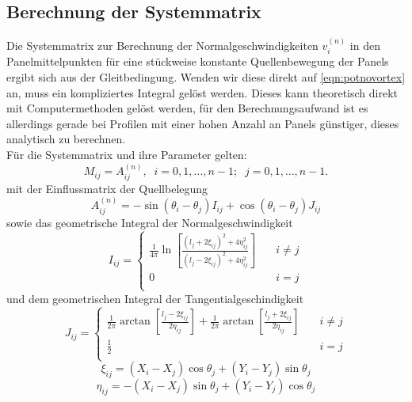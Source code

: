 \subsection{Berechnung der Systemmatrix}
\label{chap:systemmatrixtheory}
Die Systemmatrix zur Berechnung der Normalgeschwindigkeiten $v_i^{(n)}$ in den Panelmittelpunkten für eine stückweise konstante Quellenbewegung der Panels ergibt sich aus der Gleitbedingung. Wenden wir diese direkt auf \ref{eqn:potnovortex} an, muss ein kompliziertes Integral gelöst werden. Dieses kann theoretisch direkt mit Computermethoden gelöst werden, für den Berechnungsaufwand ist es allerdings gerade bei Profilen mit einer hohen Anzahl an Panels günstiger, dieses analytisch zu berechnen. \\
Für die Systemmatrix und ihre Parameter gelten:
\begin{equation}
M_{ij} = A_{ij}^{(n)}, \;\; i = 0, 1, \ldots , n-1; \;\; j = 0,1,\ldots , n-1.
\end{equation}
mit der Einflussmatrix der Quellbelegung
\begin{equation}
A_{ij}^{(n)} = -\sin {(\theta _i - \theta _j)} I_{ij} + \cos{(\theta _i - \theta _j)} J_{ij}
\end{equation}
sowie das geometrische Integral der Normalgeschwindigkeit
\begin{equation}
I_{ij} = 
     \begin{cases}
       \frac{1}{4\pi } \ln \left[ \frac{(l_j + 2 \xi_{ij})^2 + 4 \eta_{ij}^2}{(l_j -2 \xi _{ij})^2 + 4 \eta_{ij}^2} \right] &\quad i \neq j \\
       0 &\quad i = j \\
     \end{cases}
\end{equation}
und dem geometrischen Integral der Tangentialgeschindigkeit
\begin{equation}
J_{ij} = 
     \begin{cases}
       \frac{1}{2\pi } \arctan \left[ \frac{l_j - 2 \xi_{ij}}{2 \eta_{ij}} \right] + \frac{1}{2\pi } \arctan \left[ \frac{l_j + 2 \xi_{ij}}{2 \eta_{ij}} \right] &\quad i \neq j \\
       \frac{1}{2} &\quad i = j \\
     \end{cases}
\end{equation}
\begin{equation}
\xi_{ij} =  (X_i - X_j) \cos \theta _j + (Y_i - Y_j) \sin \theta _j
\end{equation}
\begin{equation}
\eta_{ij} =  -(X_i - X_j) \sin \theta _j + (Y_i - Y_j) \cos \theta _j
\end{equation}
